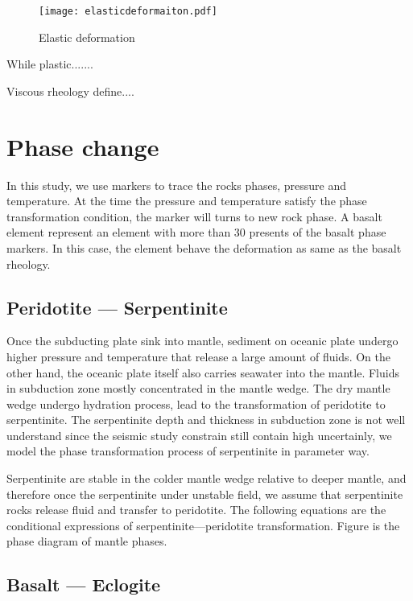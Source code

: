 \begin{figure*}[ht!]
    \centering
    \texttt{[image: elasticdeformaiton.pdf]}
    \caption{ Elastic deformation  }
    \label{fig::elastic}
\end{figure*}

While plastic.......


Viscous rheology define....

\section{Phase change}

In this study, we use markers to trace the rocks phases, pressure and temperature. 
At the time the pressure and temperature satisfy the phase transformation condition, the marker will turns to new rock phase. 
A basalt element represent an element with more than 30 presents of the basalt phase markers. 
In this case, the element behave the deformation as same as the basalt rheology.

\subsection{Peridotite --- Serpentinite}

Once the subducting plate sink into mantle, sediment on oceanic plate undergo higher pressure and temperature that release a large amount of fluids. 
On the other hand, the oceanic plate itself also carries seawater into the mantle. 
Fluids in subduction zone mostly concentrated in the mantle wedge. 
The dry mantle wedge undergo hydration process, lead to the transformation of peridotite to serpentinite.  
The serpentinite depth and thickness in subduction zone is not well understand since the seismic study constrain still contain high uncertainly, we model the phase transformation process of serpentinite in parameter way.     

Serpentinite are stable in the colder mantle wedge relative to deeper mantle, and therefore once the serpentinite under unstable field, we assume that serpentinite rocks release fluid and transfer to peridotite. 
The following equations are the conditional expressions of serpentinite---peridotite transformation. Figure is the phase diagram of mantle phases.


\subsection{Basalt --- Eclogite}

